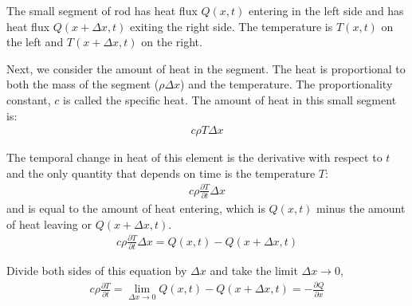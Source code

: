 The small segment of rod has heat flux $Q(x,t)$ entering in the left side and has heat flux $Q(x+\Delta x,t)$ exiting the right side. The temperature is $T(x,t)$ on the left and $T(x+\Delta x,t)$ on the right.  

\begin{center}
\end{center}

Next, we consider the amount of heat in the segment.  The heat is proportional to both the mass of the segment ($\rho \Delta x$) and the temperature.  The proportionality constant, $c$ is called the specific heat.  The amount of heat in this small segment is:
% 
\begin{align*}
c \rho T \Delta x 
\end{align*}

The temporal change in heat of this element is the derivative with respect to $t$ and the only quantity that depends on time is the temperature $T$:
% 
\begin{align*}
c \rho \frac{\partial T}{\partial t} \Delta x  
\end{align*}
and is equal to the amount of heat entering, which is $Q(x,t)$ minus the amount of heat leaving or $Q(x+\Delta x,t)$.  
% 
\begin{align*}
c \rho \frac{\partial T}{\partial t} \Delta x   = Q(x,t) - Q(x+\Delta x,t) 
\end{align*}

Divide both sides of this equation by $\Delta x$ and take the limit $\Delta x \rightarrow 0$,
%
\begin{align}
c \rho \frac{\partial T}{\partial t}    = \lim_{\Delta x \rightarrow 0} Q(x,t) - Q(x+\Delta x,t) 
 =   -\frac{\partial Q}{\partial x} \label{eq:heat:eqn:deriv}
\end{align}

